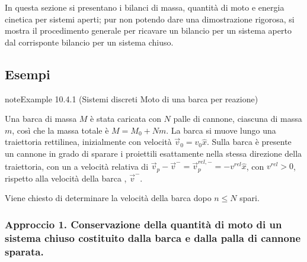 \documentclass[letterpaper,10pt,italian]{jupyterBook}
\begin{document}
\sphinxAtStartPar
In questa sezione si presentano i bilanci di massa, quantità di moto e energia cinetica per sistemi aperti; pur non potendo dare una dimostrazione rigorosa, si mostra il procedimento generale per ricavare un bilancio per un sistema aperto dal corrisponte bilancio per un sistema chiuso.


\subsection{Esempi}
\label{\detokenize{ch/mechanics/dynamics-eom-open:esempi}}\label{ch/mechanics/dynamics-eom-open:example-0}
\begin{sphinxadmonition}{note}{Example 10.4.1 (Sistemi discreti \sphinxhyphen{} Moto di una barca per reazione)}



\sphinxAtStartPar
Una barca di massa \(M\) è stata caricata con \(N\) palle di cannone, ciascuna di massa \(m\), così che la massa totale è \(M = M_0 + N m\). La barca si muove lungo una traiettoria rettilinea, inizialmente con velocità \(\vec{v}_0 = v_0 \hat{x}\). Sulla barca è presente un cannone in grado di sparare i proiettili esattamente nella stessa direzione della traiettoria, con un a velocità relativa di \(\vec{v}_p - \vec{v}^- = \vec{v}_p^{rel,-} = - v^{rel} \hat{x}\), con \(v^{rel} > 0\), rispetto alla velocità della barca , \(\vec{v}^-\).

\sphinxAtStartPar
Viene chiesto di determinare la velocità della barca dopo \(n \le N\) spari.  

\sphinxAtStartPar
{}
\subsubsection*{Approccio 1. Conservazione della quantità di moto di un sistema chiuso costituito dalla barca e dalla palla di cannone sparata.}




\end{sphinxadmonition}
\end{document}
